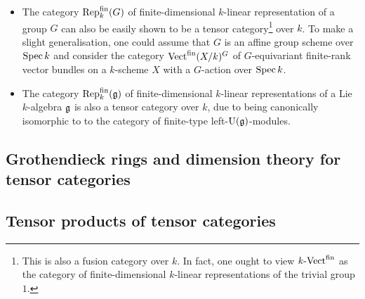             \begin{example}
                \noindent
                \begin{itemize}
                    \item The category $\mathrm{Rep}_k^{\mathrm{fin}}(G)$ of finite-dimensional $k$-linear representation of a group $G$ can also be easily shown to be a tensor category\footnote{This is also a fusion category over $k$. In fact, one ought to view $k\text{-}\mathrm{Vect}^{\mathrm{fin}}$ as the category of finite-dimensional $k$-linear representations of the trivial group $1$.} over $k$. To make a slight generalisation, one could assume that $G$ is an affine group scheme over $\operatorname{Spec} k$ and consider the category $\mathrm{Vect}^{\mathrm{fin}}(X/k)^G$ of $G$-equivariant finite-rank vector bundles on a $k$-scheme $X$ with a $G$-action over $\operatorname{Spec} k$.
                    \item The category $\mathrm{Rep}_k^{\mathrm{fin}}(\mathfrak{g})$ of finite-dimensional $k$-linear representations of a Lie $k$-algebra $\mathfrak{g}$ is also a tensor category over $k$, due to being canonically isomorphic to to the category of finite-type left-$\mathrm{U}(\mathfrak{g})$-modules. 
                \end{itemize}
            \end{example}
            
            
    
    \subsection{Grothendieck rings and dimension theory for tensor categories}
    
    \subsection{Tensor products of tensor categories}
